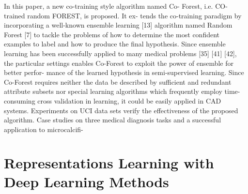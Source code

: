 \documentclass[journal]{IEEEtran}
\begin{document}
In this paper, a new co-training style algorithm named Co- Forest, i.e. CO-trained random FOREST, is proposed. It ex- tends the co-training paradigm by incorporating a well-known ensemble learning [13] algorithm named Random Forest [7] to tackle the problems of how to determine the most confident examples to label and how to produce the final hypothesis. Since ensemble learning has been successfully applied to many medical problems [35] [41] [42], the particular settings enables Co-Forest to exploit the power of ensemble for better perfor- mance of the learned hypothesis in semi-supervised learning. Since Co-Forest requires neither the data be described by sufficient and redundant attribute subsets nor special learning algorithms which frequently employ time-consuming cross validation in learning, it could be easily applied in CAD systems. Experiments on UCI data sets verify the effectiveness of the proposed algorithm. Case studies on three medical diagnosis tasks and a successful application to microcalcifi-

\section{Representations Learning with Deep Learning Methods}
\end{document}
